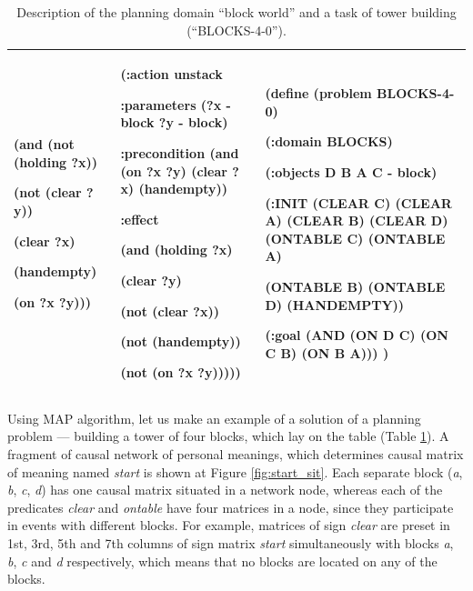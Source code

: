 \documentclass[review]{elsarticle}
\begin{document}
\begin{table}
\begin{tabular}{|p{}|p{}|p{}|}
		(and (not (holding ?x))
		
		(not (clear ?y))
		
		(clear ?x)
		
		(handempty)
		
		(on ?x ?y)))
		&
		(:\textbf{action unstack}
		
		:parameters (?x - block ?y - block)
		
		:precondition (and (on ?x ?y) (clear ?x) (handempty))
		
		:effect
		
		(and (holding ?x)
		
		(clear ?y)
		
		(not (clear ?x))
		
		(not (handempty))
		
		(not (on ?x ?y)))))
		&
		(define (\textbf{problem BLOCKS-4-0})
		
		(:domain BLOCKS)
		
		(:objects D B A C - block)
		
		(:INIT (CLEAR C) (CLEAR A) (CLEAR B) (CLEAR D) (ONTABLE C) (ONTABLE A)
		
		(ONTABLE B) (ONTABLE D) (HANDEMPTY))
		
		(:goal (AND (ON D C) (ON C B) (ON B A)))
		)\\
		\hline
	\end{tabular}
	\caption{Description of the planning domain ``block world'' and a task of tower building (``BLOCKS-4-0'').}
	\label{tab:domain}
\end{table}

Using MAP algorithm, let us make an example of a solution of a planning problem --- building a tower of four blocks, which lay on the table (Table \ref{tab:domain}). A fragment of causal network of personal meanings, which determines causal matrix of meaning named \textit{start} is shown at Figure \ref{fig:start_sit}. Each separate block (\textit{a}, \textit{b}, \textit{c}, \textit{d}) has one causal matrix situated in a network node, whereas each of the predicates \textit{clear} and \textit{ontable} have four matrices in a node, since they participate in events with different blocks. For example, matrices of sign \textit{clear} are preset in 1st, 3rd, 5th and 7th columns of sign matrix \textit{start} simultaneously with blocks \textit{a}, \textit{b}, \textit{c} and \textit{d} respectively, which means that no blocks are located on any of the blocks.
\end{document}
